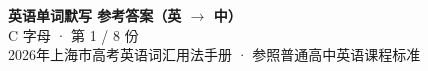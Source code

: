 \documentclass[10pt,a4paper]{article}
\begin{document}
\pagestyle{plain}

\begin{center}
{\LARGE\bfseries 英语单词默写 \quad 参考答案（英 $\to$ 中）}\\[0.22em]
{\large C 字母 · 第 1 / 8 份}\\[0.18em]
{\small 2026年上海市高考英语词汇用法手册 · 参照普通高中英语课程标准}
\end{center}

\vspace{0.2em}
\noindent{\color{rulegray}\rule{\textwidth}{0.8pt}}

\vspace{0.35em}

\vspace{0.25em}
\renewcommand{\arraystretch}{1.32}
\end{document}
